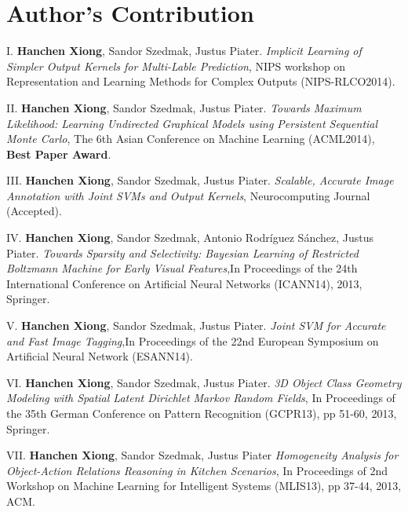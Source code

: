 \section{Author's Contribution}
\begin{shaded}
{\Huge I.} \textbf{Hanchen Xiong}, Sandor Szedmak, Justus Piater. {\it Implicit Learning of Simpler Output Kernels for Multi-Lable Prediction}, NIPS workshop on Representation and Learning Methods for Complex Outputs (NIPS-RLCO2014).  
\vspace{-.2cm}

{\Huge II.} \textbf{Hanchen Xiong}, Sandor Szedmak, Justus Piater. {\it Towards Maximum Likelihood: Learning Undirected Graphical Models using Persistent Sequential Monte Carlo}, The 6th Asian Conference on Machine Learning (ACML2014), 
\textbf{Best Paper Award}.    
\vspace{-.2cm}

{\Huge III.} \textbf{Hanchen Xiong}, Sandor Szedmak, Justus Piater. {\it Scalable, Accurate Image Annotation with Joint SVMs and Output Kernels}, Neurocomputing Journal (Accepted).  
\vspace{-.2cm}

{\Huge IV.} \textbf{Hanchen Xiong}, Sandor Szedmak, Antonio Rodr{\'i}guez S{\'a}nchez, Justus Piater. {\it Towards Sparsity and Selectivity: Bayesian Learning of Restricted Boltzmann Machine for Early Visual Features},In Proceedings of the 24th International Conference on Artificial Neural Networks (ICANN14), 2013, Springer. 
\vspace{-.2cm}

{\Huge V.} \textbf{Hanchen Xiong}, Sandor Szedmak, Justus Piater. {\it Joint SVM for Accurate and Fast Image Tagging},In Proceedings of the 22nd European Symposium on Artificial Neural Network (ESANN14). 
\vspace{-.2cm}


{\Huge VI.} \textbf{Hanchen Xiong}, Sandor Szedmak, Justus Piater. {\it 3D Object Class Geometry Modeling with Spatial Latent Dirichlet Markov Random Fields}, In Proceedings of the 35th German Conference on Pattern Recognition (GCPR13), pp 51-60, 2013,  Springer.  
\vspace{-.2cm}

{\Huge VII.} \textbf{Hanchen Xiong}, Sandor Szedmak, Justus Piater {\it Homogeneity Analysis for Object-Action Relations Reasoning in Kitchen Scenarios}, 
In Proceedings of 2nd Workshop on Machine Learning for Intelligent Systems (MLIS13), pp 37-44,  2013, ACM. 
\vspace{-.2cm}


\end{shaded}
